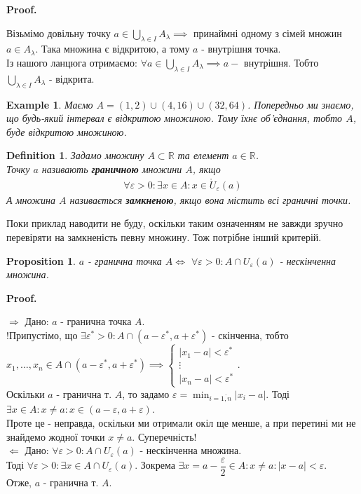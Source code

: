 \documentclass[a4paper, 14pt]{article}
\makeatletter
\def\qed{$\blacksquare$}
\def\rightproof{$\boxed{\Rightarrow}$ }
\def\leftproof{$\boxed{\Leftarrow}$ }
\theoremstyle{theoremdd}
\theoremstyle{theoremdd}
\newtheorem{definition}[theorem]{Definition}
\theoremstyle{theoremdd}
\theoremstyle{theoremdd}
\newtheorem{example}[theorem]{Example}
\theoremstyle{theoremdd}
\newtheorem{proposition}[theorem]{Proposition}
\theoremstyle{theoremdd}
\theoremstyle{theoremdd}
\theoremstyle{theoremdd}
\renewenvironment{proof}[1][Proof.\\]{\par
\pushQED{\hfill \qed}%
\normalfont \topsep6\p@\@plus6\p@\relax
\trivlist
\item\relax
{\bfseries
#1\@addpunct{.}}\hspace\labelsep\ignorespaces
}{%
\popQED\endtrivlist\@endpefalse
}
\makeatother
\begin{document}
\begin{proof}
Візьмімо довільну точку $a \in \displaystyle \bigcup_{\lambda \in I} A_{\lambda} \implies$ принаймні одному з сімей множин $a \in A_{\lambda}$. Така множина є відкритою, а тому $a$ - внутрішня точка.\\
Із нашого ланцюга отримаємо: $\forall a \in \displaystyle \bigcup_{\lambda \in I} A_{\lambda} \implies a - $ внутрішня. Тобто $\displaystyle \bigcup_{\lambda \in I} A_{\lambda}$ - відкрита.
\end{proof}

\begin{example}
Маємо $A = (1,2) \cup (4,16) \cup (32, 64)$. Попередньо ми знаємо, що будь-який інтервал є відкритою множиною. Тому їхнє об'єднання, тобто $A$, буде відкритою множиною.
\end{example}

\begin{definition}
Задамо множину $A \subset \mathbb{R}$ та елемент $a \in \mathbb{R}$.\\
Точку $a$ називають \textbf{граничною} множини $A$, якщо
\begin{align*}
\forall \varepsilon > 0: \exists x \in A: x \in \mathring{U}_{\varepsilon}(a)
\end{align*}
А множина $A$ називається \textbf{замкненою}, якщо вона містить всі граничні точки.
\end{definition}
Поки приклад наводити не буду, оскільки таким означенням не завжди зручно перевіряти на замкненість певну множину. Тож потрібне інший критерій.
\begin{proposition}
$a$ - гранична точка $A \iff$ $\forall \varepsilon > 0: A \cap U_{\varepsilon}(a)$ - нескінченна множина.
\end{proposition}

\begin{proof}
\rightproof Дано: $a$ - гранична точка $A$.\\
!Припустімо, що $\exists \varepsilon^* > 0: A \cap (a-\varepsilon^*,a+\varepsilon^*)$ - скінченна, тобто\\
$x_1,\dots,x_n \in A \cap (a-\varepsilon^*,a+\varepsilon^*) \implies \begin{cases} |x_1-a| < \varepsilon^* \\ \vdots \\ |x_n-a| < \varepsilon^* \end{cases}$.\\
Оскільки $a$ - гранична т. $A$, то задамо $\varepsilon = \displaystyle\min_{i = \overline{1,n}} |x_i-a|$. Тоді $\exists x \in A: x \neq a: x \in (a-\varepsilon,a+\varepsilon)$.\\
Проте це - неправда, оскільки ми отримали окіл ще менше, а при перетині ми не знайдемо жодної точки $x \neq a$. Суперечність!
\bigskip \\
\leftproof Дано: $\forall \varepsilon > 0: A \cap U_{\varepsilon}(a)$ - нескінченна множина.\\
Тоді $\forall \varepsilon > 0: \exists x \in A \cap U_{\varepsilon}(a)$. Зокрема $\exists x = a - \dfrac{\varepsilon}{2} \in A: x \neq a: |x-a| < \varepsilon$.\\
Отже, $a$ - гранична т. $A$.
\end{proof}
\end{document}
